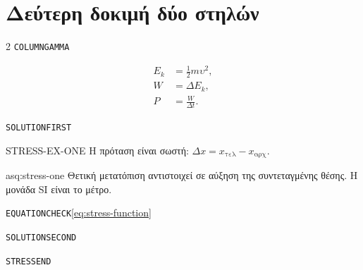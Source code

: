 \section{Δεύτερη δοκιμή δύο στηλών}
\begin{multicols}{2}
\texttt{COLUMNGAMMA}\par
\StressParagraph\StressParagraph\StressParagraph\StressParagraph
\begin{align*}
E_k&=\frac12m\upsilon^2,\\
W&=\Delta E_k,\\
P&=\frac{W}{\Delta t}.
\end{align*}
\StressParagraph
\end{multicols}
\clearpage\thispagestyle{plain}
\gdef\BookRunningChapterNumber{}
\texttt{SOLUTIONFIRST}\par
\begin{booksolution}{STRESS-EX-ONE}
Η πρόταση είναι σωστή: $\Delta x=x_{\mathrm{τελ}}-x_{\mathrm{αρχ}}$.
\end{booksolution}
\begin{AssessmentSolution}{asq:stress-one}
Θετική μετατόπιση αντιστοιχεί σε αύξηση της συντεταγμένης θέσης.
Η μονάδα SI είναι το μέτρο.
\end{AssessmentSolution}
\texttt{EQUATIONCHECK}\space\ref{eq:stress-function}\par
\StressParagraph\StressParagraph
\clearpage
\texttt{SOLUTIONSECOND}\par
\StressParagraph\StressParagraph\StressParagraph
\texttt{STRESSEND}
